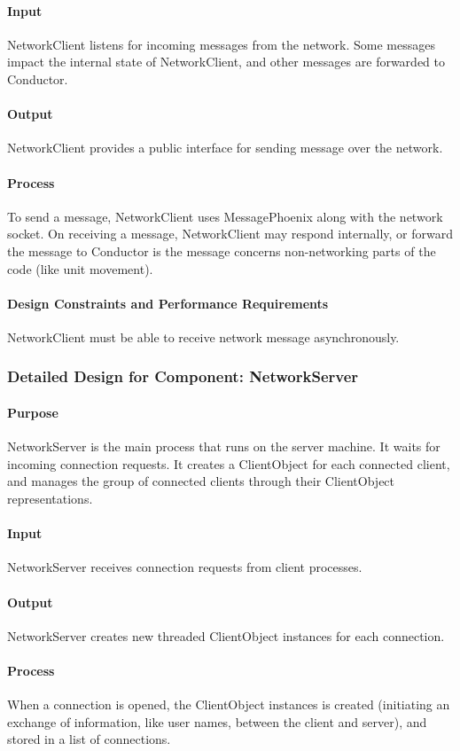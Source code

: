 \documentclass[12pt,a4paper,titlepage]{article}
\begin{document}
\paragraph{Input} NetworkClient listens for incoming messages from the network. Some messages impact the internal state of NetworkClient, and other messages are forwarded to Conductor.
\paragraph{Output} NetworkClient provides a public interface for sending message over the network.
\paragraph{Process} To send a message, NetworkClient uses MessagePhoenix along with the network socket. On receiving a message, NetworkClient may respond internally, or forward the message to Conductor is the message concerns non-networking parts of the code (like unit movement).
\paragraph{Design Constraints and Performance Requirements}
NetworkClient must be able to receive network message asynchronously. 

\subsubsection{Detailed Design for Component: NetworkServer }
\paragraph{Purpose} NetworkServer is the main process that runs on the server machine. It waits for incoming connection requests. It creates a ClientObject for each connected client, and manages the group of connected clients through their ClientObject representations. 
\paragraph{Input} NetworkServer receives connection requests from client processes.
\paragraph{Output} NetworkServer creates new threaded ClientObject instances for each connection.
\paragraph{Process} When a connection is opened, the ClientObject instances is created (initiating an exchange of information, like user names, between the client and server), and stored in a list of connections.
\end{document}
